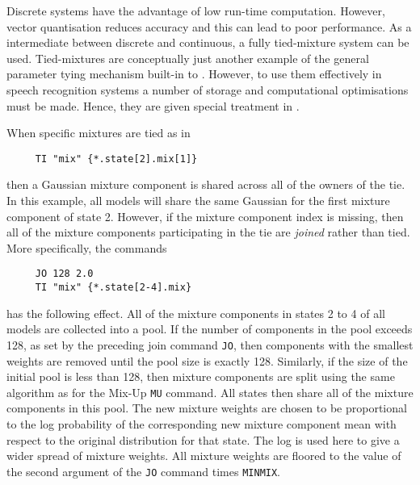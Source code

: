 
Discrete systems have the advantage of low run-time computation.  However,
vector quantisation reduces accuracy and this can lead to poor performance.
As a intermediate between discrete and continuous, a fully tied-mixture
system can be used.
Tied-mixtures are conceptually just another example of the general parameter tying
mechanism built-in to \HTK.  However, to use them effectively in
speech recognition systems a number of storage and computational 
optimisations must be made.  Hence, they are given special treatment in \HTK.

When specific mixtures are tied as in 
\begin{verbatim}
     TI "mix" {*.state[2].mix[1]} 
\end{verbatim}
then a Gaussian mixture component is shared across all of the owners
of the tie.  In this example, all models will share the same Gaussian
for the first mixture component of state 2.  However, if the mixture
component index is missing, then all of the mixture components participating in
the tie are {\it joined} rather than tied. More specifically, the commands
\begin{verbatim}
     JO 128 2.0
     TI "mix" {*.state[2-4].mix} 
\end{verbatim}
has the following effect.  All of the mixture components in states 2 to 4 of
all models are collected into a pool.  If the number of components
in the pool exceeds 128, as set by the preceding join command 
\texttt{JO}, then
components with the smallest weights are removed until the pool size is exactly
128.  Similarly, if the size of the initial pool is less than 128, then mixture
components are split using the same algorithm as for the Mix-Up \texttt{MU}
command.   All states then share all of the 
mixture components in this pool.  The new mixture weights are chosen to be proportional
to the log probability of the corresponding new mixture component mean with
respect to the original distribution for that state.  The log is used here
to give a wider spread of mixture weights.  All mixture weights are floored
to the value of the second argument of the \texttt{JO} command times 
\texttt{MINMIX}.

